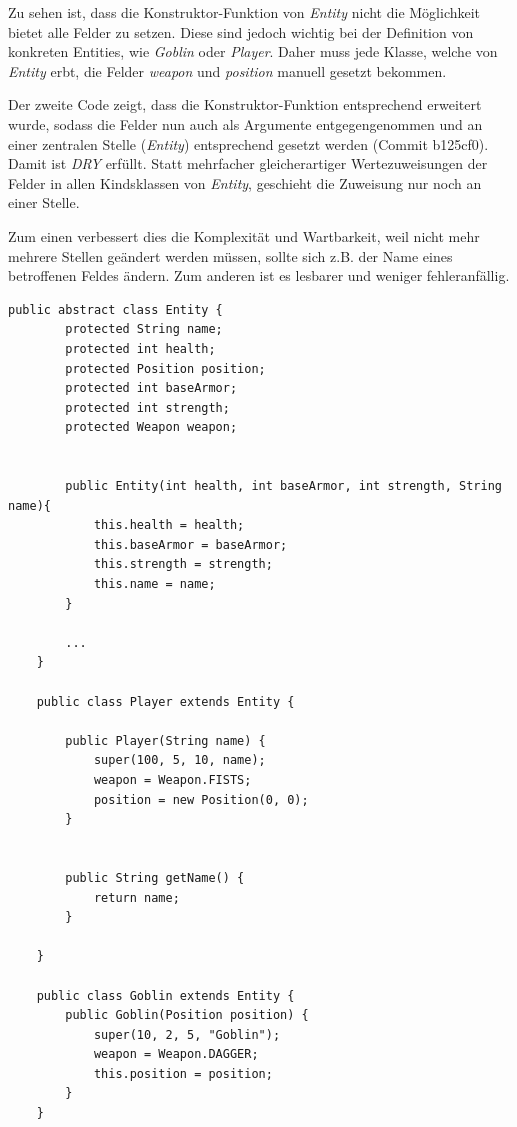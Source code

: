 Zu sehen ist, dass die Konstruktor-Funktion von \textit{Entity} nicht
die Möglichkeit bietet alle Felder zu setzen. Diese sind jedoch wichtig
bei der Definition von konkreten Entities, wie \textit{Goblin} oder
\textit{Player}. Daher muss jede Klasse, welche von \textit{Entity}
erbt, die Felder \textit{weapon} und \textit{position} manuell
gesetzt bekommen.

Der zweite Code zeigt, dass die Konstruktor-Funktion entsprechend
erweitert wurde, sodass die Felder nun auch als Argumente entgegengenommen
und an einer zentralen Stelle (\textit{Entity}) entsprechend gesetzt
werden (Commit b125cf0). Damit ist \textit{DRY} erfüllt. Statt
mehrfacher gleicherartiger Wertezuweisungen der Felder in allen
Kindsklassen von \textit{Entity}, geschieht die Zuweisung nur noch an
einer Stelle. 

Zum einen verbessert dies die Komplexität und Wartbarkeit, weil nicht
mehr mehrere Stellen geändert werden müssen, sollte sich z.B. der
Name eines betroffenen Feldes ändern. Zum anderen ist es lesbarer und
weniger fehleranfällig.


\vspace{0.5cm}
\begin{lstlisting}[caption={Don't Repeat Yourself (Vorher)}]
    public abstract class Entity {
        protected String name;
        protected int health;
        protected Position position;
        protected int baseArmor;
        protected int strength;
        protected Weapon weapon;
     
     
        public Entity(int health, int baseArmor, int strength, String name){
            this.health = health;
            this.baseArmor = baseArmor;
            this.strength = strength;
            this.name = name;
        }
        
        ...
    }     

    public class Player extends Entity {

        public Player(String name) {
            super(100, 5, 10, name);
            weapon = Weapon.FISTS;
            position = new Position(0, 0);
        }


        public String getName() {
            return name;
        }

    }

    public class Goblin extends Entity {
        public Goblin(Position position) {
            super(10, 2, 5, "Goblin");
            weapon = Weapon.DAGGER;
            this.position = position;
        }
    }
\end{lstlisting}

